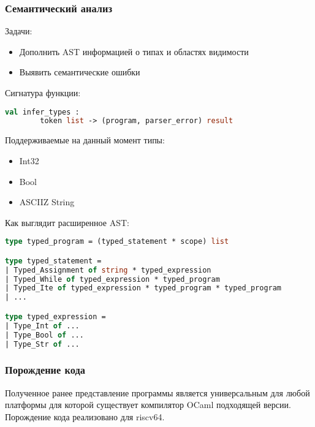 \documentclass{beamer}
\begin{document}
		\begin{frame}[fragile]
		\frametitle{Семантический анализ}
		Задачи:
		\begin{itemize}
			\item Дополнить AST информацией о типах и областях видимости
			\item Выявить семантические ошибки
		\end{itemize}
				
		Сигнатура функции:	
		\begin{lstlisting}[language=ML] 
val infer_types :
		token list -> (program, parser_error) result
		\end{lstlisting}
		
		Поддерживаемые на данный момент типы:
		\begin{itemize}
			\item Int32
			\item Bool
			\item ASCIIZ String
		\end{itemize}

		\end{frame}
	\begin{frame}[fragile]
		Как выглядит расширенное AST:

\begin{lstlisting}[language=ML] 
type typed_program = (typed_statement * scope) list

type typed_statement =
| Typed_Assignment of string * typed_expression
| Typed_While of typed_expression * typed_program
| Typed_Ite of typed_expression * typed_program * typed_program
| ...

type typed_expression =
| Type_Int of ...
| Type_Bool of ...
| Type_Str of ...

\end{lstlisting}

		\end{frame}

\begin{frame}
	\frametitle{Порождение кода}
	Полученное ранее представление программы является универсальным для любой платформы для которой существует компилятор OCaml подходящей версии.
	\\
	Порождение кода реализовано для riscv64.
	
\end{frame}
\end{document}

